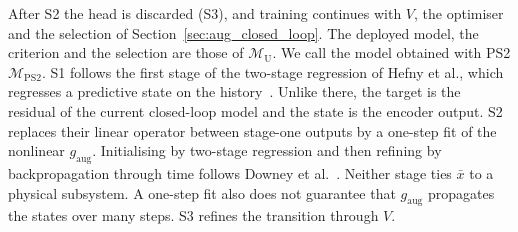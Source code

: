 After S2 the head is discarded (S3), and training continues with $V$,
the optimiser and the selection of Section~\ref{sec:aug_closed_loop}.
The deployed model, the criterion and the selection are those of
$\mathcal M_{\mathrm{U}}$.
We call the model obtained with PS2 $\mathcal M_{\mathrm{PS2}}$.
S1 follows the first stage of the two-stage regression of Hefny et al., which
regresses a predictive state on the history~\cite[Sec.~3]{hefny2015supervised}.
Unlike there, the target is the residual of the current closed-loop model and
the state is the encoder output.
S2 replaces their linear operator between stage-one outputs by a one-step fit
of the nonlinear $g_{\mathrm{aug}}$.
Initialising by two-stage regression and then refining by backpropagation
through time follows Downey et al.~\cite[Sec.~4.2]{downey2017psrnn}.
Neither stage ties $\bar x$ to a physical subsystem.
A one-step fit also does not guarantee that $g_{\mathrm{aug}}$ propagates the
states over many steps.
S3 refines the transition through $V$.
